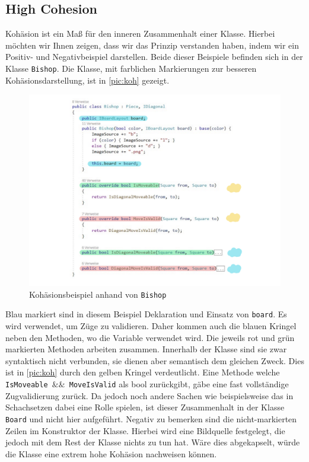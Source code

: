 \documentclass[
10pt, %
a4paper, %
oneside, %
headinclude,footinclude, %
BCOR5mm, %
]{scrartcl}
\begin{document}
\begin{onehalfspace}
\subsection{High Cohesion}
Kohäsion ist ein Maß für den inneren Zusammenhalt einer Klasse. Hierbei möchten wir Ihnen zeigen, dass wir das Prinzip verstanden haben, indem wir ein Positiv- und Negativbeispiel darstellen. Beide dieser Beispiele befinden sich in der Klasse \texttt{Bishop}. Die Klasse, mit farblichen Markierungen zur besseren Kohäsionsdarstellung, ist in \autoref{pic:koh} gezeigt.

\begin{figure}[h]
	\begin{center}
		\includegraphics[width=\textwidth]{Kohaesion.pdf}
		\caption{\label{pic:koh} Kohäsionsbeispiel anhand von \texttt{Bishop}}
	\end{center}
\end{figure}

Blau markiert sind in diesem Beispiel Deklaration und Einsatz von \texttt{board}. Es wird verwendet, um Züge zu validieren. Daher kommen auch die blauen Kringel neben den Methoden, wo die Variable verwendet wird. Die jeweils rot und grün markierten Methoden arbeiten zusammen. Innerhalb der Klasse sind sie zwar syntaktisch nicht verbunden, sie dienen aber semantisch dem gleichen Zweck. Dies ist in \autoref{pic:koh} durch den gelben Kringel verdeutlicht. Eine Methode welche \texttt{IsMoveable $\&\&$ MoveIsValid} als bool zurückgibt, gäbe eine fast vollständige Zugvalidierung zurück. Da jedoch noch andere Sachen wie beispielsweise das in Schachsetzen dabei eine Rolle spielen, ist dieser Zusammenhalt in der Klasse \texttt{Board} und nicht hier aufgeführt. 
Negativ zu bemerken sind die nicht-markierten Zeilen im Konstruktor der Klasse. Hierbei wird eine Bildquelle festgelegt, die jedoch mit dem Rest der Klasse nichts zu tun hat. Wäre dies abgekapselt, würde die Klasse eine extrem hohe Kohäsion nachweisen können.





\end{onehalfspace}
\end{document}
